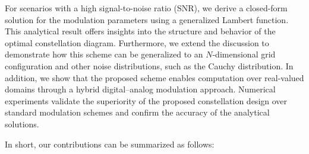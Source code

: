\documentclass[journal,12pt,onecolumn,draftclsnofoot]{IEEEtran}
\theoremstyle{definition}
\begin{document}
For scenarios with a high signal-to-noise ratio (SNR), we derive a closed-form solution for the modulation parameters using a generalized Lambert function. This analytical result offers insights into the structure and behavior of the optimal constellation diagram. Furthermore, we extend the discussion to demonstrate how this scheme can be generalized to an $N$-dimensional grid configuration and other noise distributions, such as the Cauchy distribution. In addition, we show that the proposed scheme enables computation over real-valued domains through a hybrid digital–analog modulation approach. Numerical experiments validate the superiority of the proposed constellation design over standard modulation schemes and confirm the accuracy of the analytical solutions. 




In short, our contributions can be summarized as follows:
\end{document}
